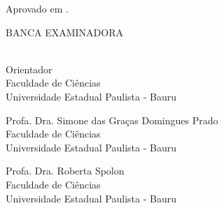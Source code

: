 
%
% 
%
\begin{folhadeaprovacao}
	\begin{center}
		{\ImprimirAutor}

		\vspace*{\fill}\vspace*{\fill}
		\begin{center}
			\bfseries\large\ImprimirTitulo
		\end{center}
		\vspace*{\fill}

		\hspace{.45\textwidth}
		\begin{minipage}{.5\textwidth}
			\imprimirpreambulo
		\end{minipage}%
		\vspace*{\fill}
	\end{center}

	Aprovado em .

	\vspace*{\fill}
	\begin{center}
		\uppercase{Banca examinadora}

		\vspace*{\fill}

		\imprimirorientador \\
		Orientador \\
		Faculdade de Ciências \\
		Universidade Estadual Paulista - Bauru \\

		\vspace*{\fill}

		Profa. Dra. Simone das Graças Domingues Prado \\
		Faculdade de Ciências \\
		Universidade Estadual Paulista - Bauru \\

		\vspace*{\fill}

		Profa. Dra. Roberta Spolon \\
		Faculdade de Ciências \\
		Universidade Estadual Paulista - Bauru \\
	\end{center}

	\vspace*{\fill}
\end{folhadeaprovacao}
